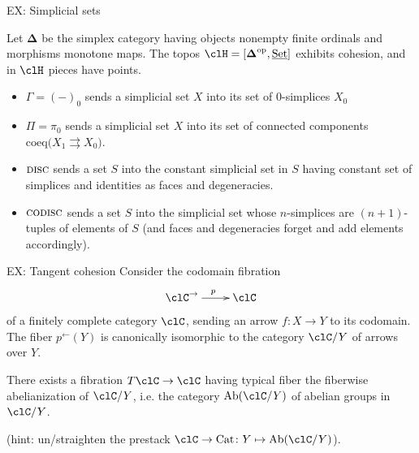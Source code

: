 \documentclass[presentation,handout]{beamer}
\begin{document}
%
%
%
%
%
%
%
\begin{frame}{EX: Simplicial sets}
  \begin{prop}
    Let $\boldsymbol\Delta$ be the \alert{simplex category} having objects nonempty finite ordinals and morphisms monotone maps. The topos $\clH=[\boldsymbol\Delta^\text{op}, \Set]$ exhibits cohesion, and in $\clH$ pieces have points.
  \end{prop}
  \begin{itemize}
    \item<+-> $\Gamma = (-)_0$ sends a simplicial set $X$ into its set of 0-simplices $X_0$
    \item<+-> $\Pi=\pi_0$ sends a simplicial set $X$ into its set of connected components $\text{coeq}\Big( X_1 \rightrightarrows X_0\Big)$.
    \item<+-> $\textsc{disc}$ sends a set $S$ into the constant simplicial set in $S$ having constant set of simplices and identities as faces and degeneracies.
    \item<+-> $\textsc{codisc}$ sends a set $S$ into the simplicial set whose $n$-simplices are $(n+1)$-tuples of elements of $S$ (and faces and degeneracies forget and add elements accordingly).
  \end{itemize}
\end{frame}
%
%
%
%
%
%
%
\begin{frame}{EX: Tangent cohesion}
  Consider the \alert{codomain fibration}
  \[
  \xymatrix{
  \clC^\to \ar[r]^p & \clC
  }
  \]
  of a finitely complete category $\clC$, sending an arrow $f\colon X\to Y$ to its codomain. The fiber $p^\leftarrow(Y)$ is canonically isomorphic to the category $\clC/Y$ of arrows over $Y$.
  \onslide<+->
  \begin{block}{}
    There exists a fibration $T\clC\to \clC$ having typical fiber the fiberwise abelianization of $\clC/Y$, i.e. the category $\text{Ab}(\clC/Y)$ of abelian groups in $\clC/Y$.
  \end{block}
  \onslide<+->
  (hint: un/straighten the prestack $\clC\to\text{Cat}\colon Y\mapsto \text{Ab}(\clC/Y)$).
  \onslide<+->
\end{frame}
\end{document}
